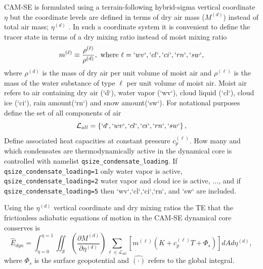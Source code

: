 \documentclass{agujournal}
\newcommand*{\gi}[1]{\widehat{#1}}
\begin{document}
CAM-SE is formulated using a terrain-following hybrid-sigma vertical coordinate $\eta$ but the coordinate levels are defined in terms of dry air mass ($M^{(d)}$) instead of total air mass; $\eta^{(d)}$ \citep[see ][ for details]{LetAl2018JAMES}. In such a coordinate system it is convenient to define the tracer state in terms of a dry mixing ratio instead of moist mixing ratio
\begin{equation}
m^{(\ell)}\equiv \frac{\rho^{(\ell)}}{\rho^{(d)}}, \text{ where }\ell=`wv`,`cl`,`ci`,`rn`,`sw`,\label{eq:mx}
\end{equation}
where $\rho^{(d)}$ is the mass of dry air per unit volume of moist air and $\rho^{(\ell)}$ is the mass of the water substance of type $\ell$ per unit volume of moist air. Moist air refers to air containing dry air (`d`), water vapor (`wv`), cloud liquid (`cl`), cloud ice (`ci`), rain amount(`rn`) and snow amount(`sw`). For notational purposes define the set of all components of air
\begin{equation}
\mathcal{L}_{all}=\left\{ `d`,`wv`,`cl`,`ci`,`rn`,`sw`\right\},
\end{equation}
Define associated heat capacities at constant pressure $c_p^{(\ell)}$. How many and which condensates are thermodynamically active in the dynamical core is controlled with namelist {\tt{qsize\_condensate\_loading}}. If {\tt{qsize\_condensate\_loading=1}} only water vapor is active, {\tt{qsize\_condensate\_loading=2}} water vapor and cloud ice is active, ..., and if {\tt{qsize\_condensate\_loading=5}} then `wv`,`cl`,`ci`,`rn`, and `sw` are included.

Using the $\eta^{(d)}$ vertical coordinate and dry mixing ratios the TE that the frictionless adiabatic equations of motion in the CAM-SE dynamical core conserves is 
\begin{equation}
\gi{E}_{dyn}=\int_{\eta=0}^{\eta=1} \iint_\mathcal{S} \left( \frac{\partial M^{(d)}}{\partial \eta^{(d)}} \right)\sum_{\ell \in \mathcal{L}_{all}} \left[m^{(\ell)} \left(K+c_p^{(\ell)}T+\Phi_s  \right)\right]  dA d \eta^{(d)},\label{eq:comprehensice_energy}
\end{equation}
where $\Phi_s$ is the surface geopotential and $\gi{(\cdot)}$ refers to the global integral.
\end{document}
